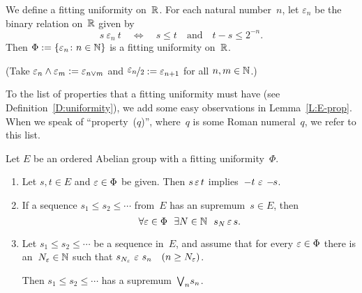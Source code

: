 \documentclass[main.tex]{subfiles}
\begin{document}
\begin{ex}
We define a fitting uniformity on~$\mathbb{R}$.
For each natural number~$n$,
let $\varepsilon_n$ be the binary relation
on~$\mathbb{R}$ given by 
\begin{equation*}
s \ \varepsilon_n\  t
\quad\iff\quad 
s\leq t\quad\text{and}\quad t-s \leq 2^{-n}.
\end{equation*}
Then $\Phi:= \{ \varepsilon_n \colon n\in \mathbb{N} \}$
is a fitting uniformity on~$\mathbb{R}$.

(Take $\varepsilon_n \wedge \varepsilon_m := \varepsilon_{n\vee m}$
and $\smash{\nicefrac{\textstyle{\varepsilon_n}}{2}} := \varepsilon_{n+1}$
for all $n,m\in \mathbb{N}$.)
\end{ex}

%
%
To the list of properties 
that a fitting uniformity must have (see Definition~\ref{D:uniformity}),
we add 
some easy observations
in Lemma~\ref{L:E-prop}.
When we speak of ``property~($q$)'',
where~$q$ is some Roman numeral~$q$,
we refer to this list.
\begin{lem}
\label{L:E-prop}
Let $E$ be an ordered Abelian group
with a fitting uniformity~$\Phi$.
\begin{enumerate}
\setcounter{enumi}{\value{epropc}}
\item \label{E-minus}
Let $s,t\in E$ and $\varepsilon \in \Phi$ be given.
Then $s \,\varepsilon\, t$ implies\, $-t \ \varepsilon\,-\!\!s$.

\item \label{E-sup-conv}
If a sequence $s_1 \leq s_2 \leq \dotsb$ from~$E$
has an supremum~$s\in E$,
then 
\begin{equation*}
\forall\varepsilon\in \Phi
\ \ \exists N\in \mathbb{N}
\ \ s_N \, \varepsilon\, s.
\end{equation*}

\item  \label{E-bound-sup}
Let $s_1\leq s_2 \leq \dotsb$ be a
sequence in~$E$,
and assume that
for every $\varepsilon\in \Phi$
there is an~$N_\varepsilon \in \mathbb{N}$ such that 
$s_{N_\varepsilon} \ \varepsilon \ s_n\quad (n\geq N_\varepsilon)$.

Then $s_1 \leq s_2 \leq \dotsb$ has a supremum~$\textstyle{\bigvee}_n s_n$.
\end{enumerate}
\end{lem}
\end{document}
